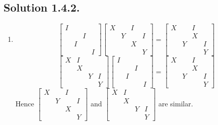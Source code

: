 \documentclass{article}
\begin{document}
\subsection*{Solution 1.4.2.}
\begin{enumerate}
    \item 
    \[\left[
    \begin{array}{cccc}
    I\\&&I\\&I\\&&&I
    \end{array}
    \right]\left[
    \begin{array}{cccc}
    X&&I\\&Y&&I\\&&X\\&&&Y
    \end{array}
    \right]=\left[
    \begin{array}{cccc}
    X&&I\\&&X\\&Y&&I\\&&&Y
    \end{array}
    \right]
    \]
    \[\left[
    \begin{array}{cccc}
    X&I\\&X\\&&Y&I\\&&&Y
    \end{array}
    \right]\left[
    \begin{array}{cccc}
    I\\&&I\\&I\\&&&I
    \end{array}
    \right]=\left[
    \begin{array}{cccc}
    X&&I\\&&X\\&Y&&I\\&&&Y
    \end{array}
    \right]\]
    Hence $\left[
    \begin{array}{cccc}
    X&&I\\&Y&&I\\&&X\\&&&Y
    \end{array}
    \right]$ and $\left[
    \begin{array}{cccc}
    X&I\\&X\\&&Y&I\\&&&Y
    \end{array}
    \right]$ are similar.

\end{enumerate}
\end{document}
